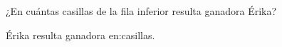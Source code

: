 ¿En cuántas casillas de la fila inferior resulta ganadora Érika?

Érika resulta ganadora en:\fillin[3] casillas.